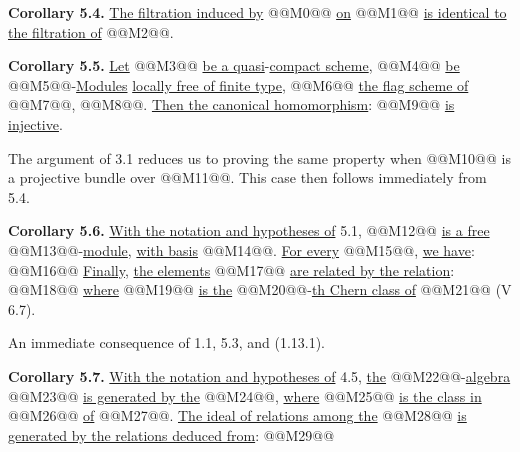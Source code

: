 \textbf{Corollary 5.4.} \uline{The filtration induced by} @@M0@@ \uline{on} @@M1@@ \uline{is identical to the filtration of} @@M2@@.

\textbf{Corollary 5.5.} \uline{Let} @@M3@@ \uline{be a quasi}-\uline{compact scheme}, @@M4@@ \uline{be} @@M5@@-\uline{Modules} \uline{locally free of finite type}, @@M6@@ \uline{the flag scheme of} @@M7@@, @@M8@@. \uline{Then the canonical homomorphism}:
@@M9@@
\uline{is injective}.

The argument of 3.1 reduces us to proving the same property when @@M10@@ is a projective bundle over @@M11@@. This case then follows immediately from 5.4.

\textbf{Corollary 5.6.} \uline{With the notation and hypotheses of} 5.1, @@M12@@ \uline{is a free} @@M13@@-\uline{module}, \uline{with basis} @@M14@@. \uline{For every} @@M15@@, \uline{we have}:
@@M16@@
\uline{Finally}, \uline{the elements} @@M17@@ \uline{are related by the relation}:
@@M18@@
\uline{where} @@M19@@ \uline{is the} @@M20@@-\uline{th Chern class of} @@M21@@ (V 6.7).

An immediate consequence of 1.1, 5.3, and (1.13.1).

\textbf{Corollary 5.7.} \uline{With the notation and hypotheses of} 4.5, \uline{the} @@M22@@-\uline{algebra} @@M23@@ \uline{is generated by the} @@M24@@, \uline{where} @@M25@@ \uline{is the class in} @@M26@@ \uline{of} @@M27@@. \uline{The ideal of relations among the} @@M28@@ \uline{is generated by the relations deduced from}:
@@M29@@
